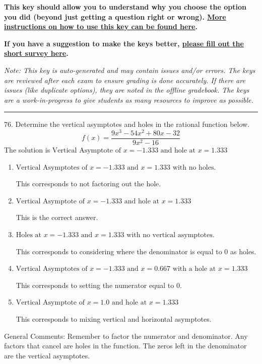 \documentclass{extbook}[14pt]
\begin{document}
\textbf{This key should allow you to understand why you choose the option you did (beyond just getting a question right or wrong). \href{https://xronos.clas.ufl.edu/mac1105spring2020/courseDescriptionAndMisc/Exams/LearningFromResults}{More instructions on how to use this key can be found here}.}

\textbf{If you have a suggestion to make the keys better, \href{https://forms.gle/CZkbZmPbC9XALEE88}{please fill out the short survey here}.}

\textit{Note: This key is auto-generated and may contain issues and/or errors. The keys are reviewed after each exam to ensure grading is done accurately. If there are issues (like duplicate options), they are noted in the offline gradebook. The keys are a work-in-progress to give students as many resources to improve as possible.}

\rule{\textwidth}{0.4pt}

76. Determine the vertical asymptotes and holes in the rational function below.
\[ f(x) = \frac{9x^{3} -54 x^{2} +80 x -32}{9x^{2} -16} \] 
The solution is $ \text{Vertical Asymptote of } x = -1.333 \text{ and hole at } x = 1.333 $ 

\begin{enumerate}[label=\Alph*.] 
\item $ \text{Vertical Asymptotes of } x = -1.333 \text{ and } x = 1.333 \text{ with no holes.} $ 

 This corresponds to not factoring out the hole. 
\item $ \text{Vertical Asymptote of } x = -1.333 \text{ and hole at } x = 1.333 $ 

 This is the correct answer. 
\item $ \text{Holes at } x = -1.333 \text{ and } x = 1.333 \text{ with no vertical asymptotes.} $ 

 This corresponds to considering where the denominator is equal to 0 as holes. 
\item $ \text{Vertical Asymptotes of } x = -1.333 \text{ and } x = 0.667 \text{ with a hole at } x = 1.333 $ 

 This corresponds to setting the numerator equal to 0. 
\item $ \text{Vertical Asymptote of } x = 1.0 \text{ and hole at } x = 1.333 $ 

 This corresponds to mixing vertical and horizontal asymptotes. 
\end{enumerate} 
 
General Comments: Remember to factor the numerator and denominator. Any factors that cancel are holes in the function. The zeros left in the denominator are the vertical asymptotes.
\end{document}
